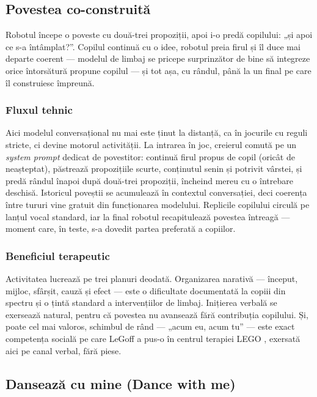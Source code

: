 \subsection{Povestea co-construită}

Robotul începe o poveste cu două-trei propoziții, apoi i-o predă copilului: „și apoi ce s-a întâmplat?”. Copilul continuă cu o idee, robotul preia firul și îl duce mai departe coerent — modelul de limbaj se pricepe surprinzător de bine să integreze orice întorsătură propune copilul — și tot așa, cu rândul, până la un final pe care îl construiesc împreună.

\subsubsection*{Fluxul tehnic}
Aici modelul conversațional nu mai este ținut la distanță, ca în jocurile cu reguli stricte, ci devine motorul activității. La intrarea în joc, creierul comută pe un \emph{system prompt} dedicat de povestitor: continuă firul propus de copil (oricât de neașteptat), păstrează propozițiile scurte, conținutul senin și potrivit vârstei, și predă rândul înapoi după două-trei propoziții, încheind mereu cu o întrebare deschisă. Istoricul poveștii se acumulează în contextul conversației, deci coerența între tururi vine gratuit din funcționarea modelului. Replicile copilului circulă pe lanțul vocal standard, iar la final robotul recapitulează povestea întreagă — moment care, în teste, s-a dovedit partea preferată a copiilor.

\subsubsection*{Beneficiul terapeutic}
Activitatea lucrează pe trei planuri deodată. Organizarea narativă — început, mijloc, sfârșit, cauză și efect — este o dificultate documentată la copiii din spectru și o țintă standard a intervențiilor de limbaj. Inițierea verbală se exersează natural, pentru că povestea nu avansează fără contribuția copilului. Și, poate cel mai valoros, schimbul de rând — „acum eu, acum tu” — este exact competența socială pe care LeGoff a pus-o în centrul terapiei LEGO \cite{legoff2004}, exersată aici pe canal verbal, fără piese.

\subsection{Dansează cu mine (Dance with me)}

